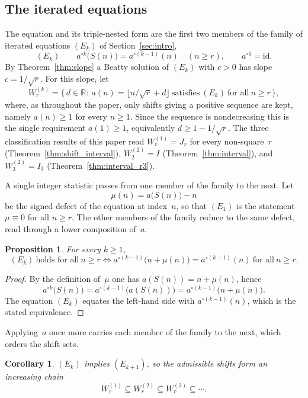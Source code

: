 \documentclass{birkjour}
\newtheorem{proposition}[theorem]{Proposition}
\newtheorem{corollary}[theorem]{Corollary}
\theoremstyle{definition}
\theoremstyle{remark}
\newcommand{\fl}[1]{\lfloor #1 \rfloor}
\begin{document}
\subsection{The iterated equations}
\label{ssec:composed}

The equation and its triple-nested form are the first two
members of the family of iterated equations $(E_{k})$ of
Section~\ref{sec:intro},
\[
  (E_{k})\qquad a^{\circ k}\bigl(S(n)\bigr)=a^{\circ(k-1)}(n)
  \quad (n\ge r),\qquad a^{\circ 0}=\mathrm{id}.
\]
By Theorem~\ref{thm:slope} a Beatty solution of $(E_{k})$
with $c>0$ has slope $c=1/\!\sqrt{r}$. For this slope, let
\[
  W_{r}^{(k)}=\bigl\{\,d\in\mathbb{R}:\
  a(n)=\fl{n/\!\sqrt{r}+d}\ \text{satisfies}\ (E_{k})
  \ \text{for all}\ n\ge r\,\bigr\},
\]
where, as throughout the paper, only shifts giving a positive
sequence are kept, namely $a(n)\ge 1$ for every $n\ge 1$.
Since the sequence is nondecreasing this is the single
requirement $a(1)\ge 1$, equivalently $d\ge 1-1/\!\sqrt{r}$.
The three
classification results of this paper read
$W_{r}^{(1)}=J_{r}$ for every non-square~$r$
(Theorem~\ref{thm:shift_interval}), $W_{2}^{(2)}=I$
(Theorem~\ref{thm:interval}), and $W_{3}^{(2)}=I_{3}$
(Theorem~\ref{thm:interval_r3}).

A single integer statistic passes from one member of the
family to the next. Let
\[
  \mu(n)=a\bigl(S(n)\bigr)-n
\]
be the signed defect of the equation at index~$n$, so that
$(E_{1})$ is the statement $\mu\equiv 0$ for all $n\ge r$. The
other members of the family reduce to the same defect, read
through a lower composition of~$a$.

\begin{proposition}\label{prop:composed}
For every $k\ge 1$,
\[
  (E_{k})\ \text{holds for all}\ n\ge r
  \iff
  a^{\circ(k-1)}\bigl(n+\mu(n)\bigr)=a^{\circ(k-1)}(n)
  \ \text{for all}\ n\ge r.
\]
\end{proposition}

\begin{proof}
By the definition of~$\mu$ one has $a(S(n))=n+\mu(n)$, hence
\[
  a^{\circ k}\bigl(S(n)\bigr)
  =a^{\circ(k-1)}\bigl(a(S(n))\bigr)
  =a^{\circ(k-1)}\bigl(n+\mu(n)\bigr).
\]
The equation $(E_{k})$ equates the left-hand side with
$a^{\circ(k-1)}(n)$, which is the stated equivalence.
\end{proof}

Applying~$a$ once more carries each member of the family to
the next, which orders the shift sets.

\begin{corollary}\label{cor:chain}
$(E_{k})$ implies $(E_{k+1})$, so the admissible shifts form
an increasing chain
\[
  W_{r}^{(1)}\subseteq W_{r}^{(2)}\subseteq
  W_{r}^{(3)}\subseteq\cdots.
\]
\end{corollary}
\end{document}

